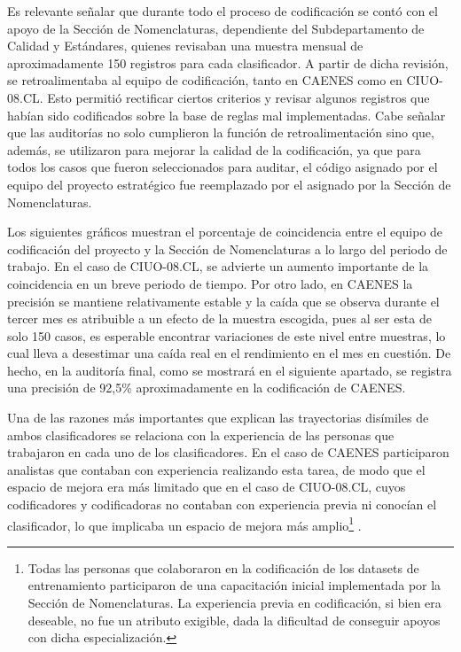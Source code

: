 \documentclass[
  12pt,
  spanish,
]{article}
\begin{document}
Es relevante señalar que durante todo el proceso de codificación se
contó con el apoyo de la Sección de Nomenclaturas, dependiente del
Subdepartamento de Calidad y Estándares, quienes revisaban una muestra
mensual de aproximadamente 150 registros para cada clasificador. A
partir de dicha revisión, se retroalimentaba al equipo de codificación,
tanto en CAENES como en CIUO-08.CL. Esto permitió rectificar ciertos
criterios y revisar algunos registros que habían sido codificados sobre
la base de reglas mal implementadas. Cabe señalar que las auditorías no
solo cumplieron la función de retroalimentación sino que, además, se
utilizaron para mejorar la calidad de la codificación, ya que para todos
los casos que fueron seleccionados para auditar, el código asignado por
el equipo del proyecto estratégico fue reemplazado por el asignado por
la Sección de Nomenclaturas.

Los siguientes gráficos muestran el porcentaje de coincidencia entre el
equipo de codificación del proyecto y la Sección de Nomenclaturas a lo
largo del periodo de trabajo. En el caso de CIUO-08.CL, se advierte un
aumento importante de la coincidencia en un breve periodo de tiempo. Por
otro lado, en CAENES la precisión se mantiene relativamente estable y la
caída que se observa durante el tercer mes es atribuible a un efecto de
la muestra escogida, pues al ser esta de solo 150 casos, es esperable
encontrar variaciones de este nivel entre muestras, lo cual lleva a
desestimar una caída real en el rendimiento en el mes en cuestión. De
hecho, en la auditoría final, como se mostrará en el siguiente apartado,
se registra una precisión de 92,5\% aproximadamente en la codificación
de CAENES.

Una de las razones más importantes que explican las trayectorias
disímiles de ambos clasificadores se relaciona con la experiencia de las
personas que trabajaron en cada uno de los clasificadores. En el caso de
CAENES participaron analistas que contaban con experiencia realizando
esta tarea, de modo que el espacio de mejora era más limitado que en el
caso de CIUO-08.CL, cuyos codificadores y codificadoras no contaban con
experiencia previa ni conocían el clasificador, lo que implicaba un
espacio de mejora más amplio\footnote{Todas las personas que colaboraron
  en la codificación de los datasets de entrenamiento participaron de
  una capacitación inicial implementada por la Sección de Nomenclaturas.
  La experiencia previa en codificación, si bien era deseable, no fue un
  atributo exigible, dada la dificultad de conseguir apoyos con dicha
  especialización.} .
\end{document}
